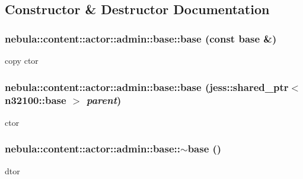 \subsection{Constructor \& Destructor Documentation}
\hypertarget{classnebula_1_1content_1_1actor_1_1admin_1_1base_a81ae2f1aff51df4e46e030f53f116f05}{
\subsubsection[{base}]{\setlength{\rightskip}{0pt plus 5cm}nebula::content::actor::admin::base::base (const {\bf base} \&)}}
\label{classnebula_1_1content_1_1actor_1_1admin_1_1base_a81ae2f1aff51df4e46e030f53f116f05}


copy ctor \hypertarget{classnebula_1_1content_1_1actor_1_1admin_1_1base_a9f4825b76ce7cdfe0305835f57d1b328}{
\subsubsection[{base}]{\setlength{\rightskip}{0pt plus 5cm}nebula::content::actor::admin::base::base (jess::shared\_\-ptr$<$ {\bf n32100::base} $>$ {\em parent})}}
\label{classnebula_1_1content_1_1actor_1_1admin_1_1base_a9f4825b76ce7cdfe0305835f57d1b328}


ctor \hypertarget{classnebula_1_1content_1_1actor_1_1admin_1_1base_abaf69103377ea0ece77addee5901911a}{
\subsubsection[{$\sim$base}]{\setlength{\rightskip}{0pt plus 5cm}nebula::content::actor::admin::base::$\sim$base ()}}
\label{classnebula_1_1content_1_1actor_1_1admin_1_1base_abaf69103377ea0ece77addee5901911a}


dtor 

